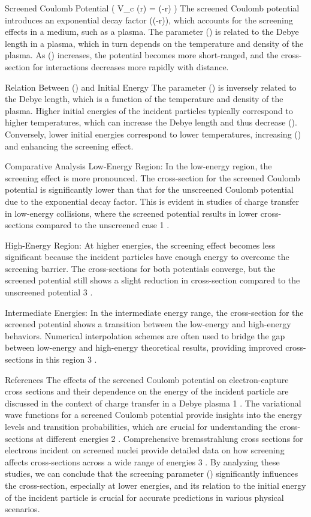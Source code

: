 Screened Coulomb Potential ( V_c (r) =  \exp(-\alpha r) )
The screened Coulomb potential introduces an exponential decay factor (\exp(-\alpha r)), which accounts for the screening effects in a medium, such as a plasma. The parameter (\alpha) is related to the Debye length in a plasma, which in turn depends on the temperature and density of the plasma. As (\alpha) increases, the potential becomes more short-ranged, and the cross-section for interactions decreases more rapidly with distance.

Relation Between (\alpha) and Initial Energy
The parameter (\alpha) is inversely related to the Debye length, which is a function of the temperature and density of the plasma. Higher initial energies of the incident particles typically correspond to higher temperatures, which can increase the Debye length and thus decrease (\alpha). Conversely, lower initial energies correspond to lower temperatures, increasing (\alpha) and enhancing the screening effect.

Comparative Analysis
Low-Energy Region: In the low-energy region, the screening effect is more pronounced. The cross-section for the screened Coulomb potential is significantly lower than that for the unscreened Coulomb potential due to the exponential decay factor. This is evident in studies of charge transfer in low-energy collisions, where the screened potential results in lower cross-sections compared to the unscreened case
1
.

High-Energy Region: At higher energies, the screening effect becomes less significant because the incident particles have enough energy to overcome the screening barrier. The cross-sections for both potentials converge, but the screened potential still shows a slight reduction in cross-section compared to the unscreened potential
3
.

Intermediate Energies: In the intermediate energy range, the cross-section for the screened potential shows a transition between the low-energy and high-energy behaviors. Numerical interpolation schemes are often used to bridge the gap between low-energy and high-energy theoretical results, providing improved cross-sections in this region
3
.

References
The effects of the screened Coulomb potential on electron-capture cross sections and their dependence on the energy of the incident particle are discussed in the context of charge transfer in a Debye plasma
1
.
The variational wave functions for a screened Coulomb potential provide insights into the energy levels and transition probabilities, which are crucial for understanding the cross-sections at different energies
2
.
Comprehensive bremsstrahlung cross sections for electrons incident on screened nuclei provide detailed data on how screening affects cross-sections across a wide range of energies
3
.
By analyzing these studies, we can conclude that the screening parameter (\alpha) significantly influences the cross-section, especially at lower energies, and its relation to the initial energy of the incident particle is crucial for accurate predictions in various physical scenarios.